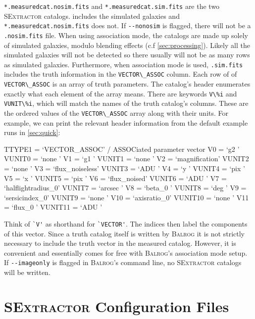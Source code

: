 \documentclass[11pt]{book}
\newcommand{\codett}[1]{\lstinline{#1}}
\newcommand{\balrog}{\textsc{Balrog}}
\newcommand{\sex}{\textsc{SExtractor}}
\newcommand{\opt}[1]{\codett{--#1}}
\begin{document}
\codett{*.measuredcat.nosim.fits} and \codett{*.measuredcat.sim.fits} are the two \sex{} catalogs.
 includes the simulated galaxies and \codett{*.measuredcat.nosim.fits} does not.
If \opt{nonosim} is flagged, there will not be a \codett{.nosim.fits} file.
When using association mode, the catalogs are made up solely of simulated galaxies, 
modulo blending effects (c.f \autoref{sec:processing}). Likely all the simulated galaxies will not
be detected so there usually will not be as many rows as simulated galaxies.
Furthermore, when  association mode is used, \codett{.sim.fits} includes the truth information
in the \codett{VECTOR\_ASSOC} column. Each row of of \codett{VECTOR\_ASSOC} is an array of truth parameters.
The catalog's header enumerates exactly what each element of the array means.
There are keywords \codett{V\%i} and \codett{VUNIT\%i}, which will match the names of the truth catalog's columns.
These are the ordered values of the \codett{VECTOR\_ASSOC} array along with their units.
For example, we can print the relevant header information from the default example runs in \autoref{sec:quick}:
\begin{cmdline}
TTYPE1  = `VECTOR_ASSOC'       / ASSOCiated parameter vector
V0      = `g2      '
VUNIT0  = `none    '
V1      = `g1      '
VUNIT1  = `none    '
V2      = `magnification'
VUNIT2  = `none    '
V3      = `flux_noiseless'
VUNIT3  = `ADU     '
V4      = `y       '
VUNIT4  = `pix     '
V5      = `x       '
VUNIT5  = `pix     '
V6      = `flux_noised'
VUNIT6  = `ADU     '
V7      = `halflightradius_0'
VUNIT7  = `arcsec  '
V8      = `beta_0  '
VUNIT8  = `deg     '
V9      = `sersicindex_0'
VUNIT9  = `none    '
V10     = `axisratio_0'
VUNIT10 = `none    '
V11     = `flux_0  '
VUNIT11 = `ADU     '
\end{cmdline}
Think of \codett{`V'} as shorthand for \codett{`VECTOR'}. The indices then label the components of this vector.
Since a truth catalog itself is written by \balrog{} it is not strictly necessary to include the truth
vector in the measured catalog. However, it is convenient and essentially comes for free with \balrog{}'s
association mode setup. 
If \opt{imageonly} is flagged in \balrog{}'s command line, no \sex{} catalogs will be written.



\section{\sex{} Configuration Files}
\label{sec:sexfiles}
\end{document}

